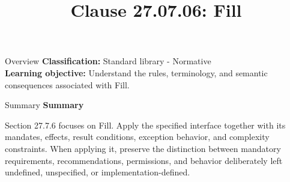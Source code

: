 \documentclass[10pt,letterpaper]{article}
\title{Clause 27.07.06: Fill}
\author{}
\date{}
\begin{document}
\maketitle
\begin{CornellOverviewBox}{Overview}
\textbf{Classification:} Standard library - Normative\\[2pt]
\textbf{Learning objective:} Understand the rules, terminology, and semantic consequences associated with Fill.
\end{CornellOverviewBox}\begin{CornellSummaryBox}{Summary}
{\sffamily\bfseries\color{Accent} Summary}\par\vspace{3pt}Section 27.7.6 focuses on Fill. Apply the specified interface together with its mandates, effects, result conditions, exception behavior, and complexity constraints. When applying it, preserve the distinction between mandatory requirements, recommendations, permissions, and behavior deliberately left undefined, unspecified, or implementation-defined.
\end{CornellSummaryBox}
\end{document}
